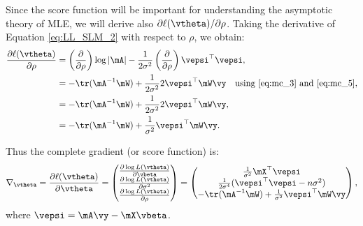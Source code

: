 \documentclass[english,12pt]{book}\usepackage[]{graphicx}\usepackage[]{xcolor}
\begin{document}
Since the score function will be important for understanding the asymptotic theory of MLE, we will derive also $\partial \ell(\vtheta) / \partial \rho$. Taking the derivative of Equation \eqref{eq:LL_SLM_2} with respect to $\rho$, we obtain:
\begin{equation}\label{eq:der1_rho}
  \begin{aligned}
      \frac{\partial \ell(\vtheta)}{\partial \rho} & =  \left(\frac{\partial}{\partial \rho}\right)\log \left| \mA\right| -  \frac{1}{2\sigma^2}\left(\frac{\partial}{\partial \rho}\right)\vepsi^\top \vepsi, \\
      & = - \tr(\mA^{-1}\mW) +\frac{1}{2\sigma^2}2\vepsi^\top\mW\vy\quad\mbox{using \eqref{eq:mc_3} and \eqref{eq:mc_5}}, \\
      & = - \tr(\mA^{-1}\mW) +\frac{1}{2\sigma^2}2\vepsi^\top\mW\vy, \\
      & = - \tr(\mA^{-1}\mW) +\frac{1}{\sigma^2}\vepsi^\top\mW\vy. 
  \end{aligned}
\end{equation}

Thus the complete gradient (or score function) is:
\begin{equation}\label{eq:full_agradient}
  \nabla_{\vtheta} = \frac{\partial \ell(\vtheta)}{\partial \vtheta} = 
    \begin{pmatrix}
    \frac{\partial \log L(\vtheta)}{\partial \vbeta} \\
    \frac{\partial \log L(\vtheta)}{\partial \sigma^2} \\
    \frac{\partial \log L(\vtheta)}{\partial \rho}
    \end{pmatrix}
    =
    \begin{pmatrix}
    \frac{1}{\sigma^2}\mX^\top\vepsi \\
    \frac{1}{2\sigma^4}(\vepsi^\top\vepsi-n\sigma^2) \\
    - \tr(\mA^{-1}\mW) +\frac{1}{\sigma^2}\vepsi^\top\mW\vy
    \end{pmatrix},
\end{equation}
%
where $\vepsi = \mA\vy - \mX\vbeta$.

% 
\end{document}
